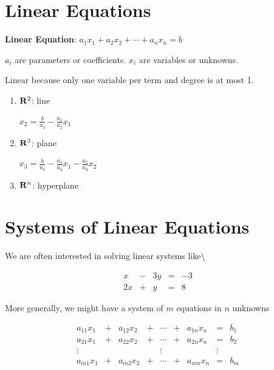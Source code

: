 \documentclass[]{book}
\theoremstyle{definition}
\theoremstyle{definition}
\theoremstyle{definition}
\theoremstyle{remark}
\begin{document}
\section{Linear Equations}\label{linear-equations}

\textbf{Linear Equation}: \(a_1 x_1 + a_2 x_2 + \cdots + a_n x_n = b\)

\(a_i\) are parameters or coefficients. \(x_i\) are variables or
unknowns.

Linear because only one variable per term and degree is at most 1.

\begin{enumerate} 
        \item \parbox[t]{1.5in}{${\bf R}^2$: line} $x_2 = \frac{b}{a_2}-\frac{a_1}{a_2} x_1$
        \item \parbox[t]{1.5in}{${\bf R}^3$: plane} $x_3= \frac{b}{a_3}-\frac{a_1}{a_3} x_1-\frac{a_2}{a_3} x_2 $
        \item ${\bf R}^n$: hyperplane
    \end{enumerate}

\section{Systems of Linear Equations}\label{systems-of-linear-equations}

We are often interested in solving linear systems like\textbackslash{}

\[\begin{matrix}
            x  & - & 3y & = & -3\\
            2x & + &  y & = &  8
            \end{matrix}\]

More generally, we might have a system of \(m\) equations in \(n\)
unknowns

\[\begin{matrix}
            a_{11}x_1  & + & a_{12}x_2 & + & \cdots & + & a_{1n}x_n & = & b_1\\
            a_{21}x_1  & + & a_{22}x_2 & + & \cdots & + & a_{2n}x_n & = & b_2\\
            \vdots     &   &     &   & \vdots &   &     & \vdots & \\
            a_{m1}x_1  & + & a_{m2}x_2 & + & \cdots & + & a_{mn}x_n & = & b_m
            \end{matrix}\]
\end{document}
